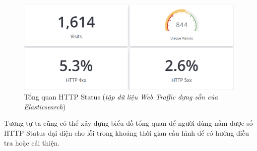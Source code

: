\begin{figure}[H] %
    \centering %
    \includegraphics[width=1\textwidth]{figures/http_stt_sum.png} 
    \caption{ Tổng quan HTTP Status (\textit{tập dữ liệu Web Traffic dựng sẵn của Elasticsearch})} %
    \label{fig:elk_01}
\end{figure}

Tương tự ta cũng có thể xây dựng biểu đồ tổng quan để người dùng nắm được số HTTP Status đại diện cho lỗi trong khoảng thời gian cấu hình để có hướng điều tra hoặc cải thiện.